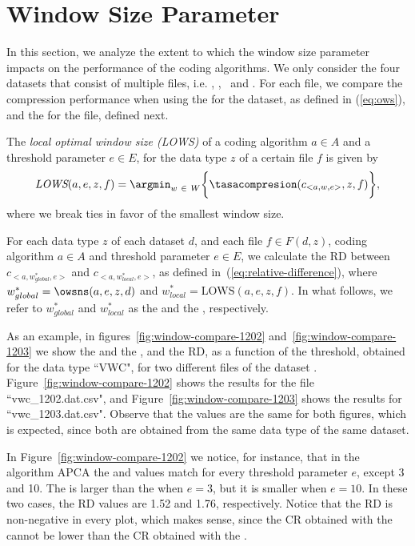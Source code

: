 
\clearpage
\section{Window Size Parameter}
\label{secX:windows}


\newcommand{\lows}{\text{LOWS\ }}
\newcommand{\lowsns}{\text{LOWS}}
In this section, we analyze the extent to which the window size parameter impacts on the performance of the coding algorithms. We only consider the four datasets that consist of multiple files, i.e. \datasetirkis, \datasetsst, \datasetadcp \ and \datasetsolar. For each file, we compare the compression performance when using the \ows for the dataset, as defined in (\ref{eq:ows}), and the \lows for the file, defined next.


\newcommand{\lowsit}{\textit{LOWS}}
\begin{defcion}
The \textit{local optimal window size (\lowsit)} of a coding algorithm $a \in A$ and a threshold parameter $e \in E$, for the data type $z$ of a certain file $f$ is given by
\begin{equation}
\lowsit(a, e, z, f) = \argmin_{w\ \in \ W} \biggl\{ \tasacompresion(c_{<a, w, e>}, z, f) \biggr\},
\end{equation}
where we break ties in favor of the smallest window size.
\end{defcion}


For each data type $z$ of each dataset $d$, and each file $f \in F(d, z)$, coding algorithm $a \in A$ and threshold parameter $e \in E$, we calculate the RD between $c_{<a, w_{global}^{*}, e>}$ and $c_{<a, w_{local}^{*}, e>}$, as defined in~(\ref{eq:relative-difference}), where $w_{global}^{*}=\owsns(a, e, z, d)$ and $w_{local}^{*}=\lowsns(a, e, z, f)$. In what follows, we refer to $w_{global}^{*}$ and $w_{local}^{*}$ as the \ows and the \lows, respectively.


As an example, in figures~\ref{fig:window-compare-1202} and~\ref{fig:window-compare-1203} we show the \ows and the \lows, and the RD, as a function of the threshold, obtained for the data type ``VWC", for two different files of the dataset \datasetirkis. Figure~\ref{fig:window-compare-1202} shows the results for the file ``vwc\_1202.dat.csv", and Figure~\ref{fig:window-compare-1203} shows the results for ``vwc\_1203.dat.csv". Observe that the \ows values are the same for both figures, which is expected, since both are obtained from the same data type of the same dataset.


In Figure~\ref{fig:window-compare-1202} we notice, for instance, that in the algorithm APCA the \ows and \lows values match for every threshold parameter $e$, except 3 and 10. The \ows is larger than the \lows when $e=3$, but it is smaller when $e=10$. In these two cases, the RD values are 1.52 and 1.76, respectively. Notice that the RD is non-negative in every plot, which makes sense, since the CR obtained with the \ows cannot be lower than the CR obtained with the \lows.


